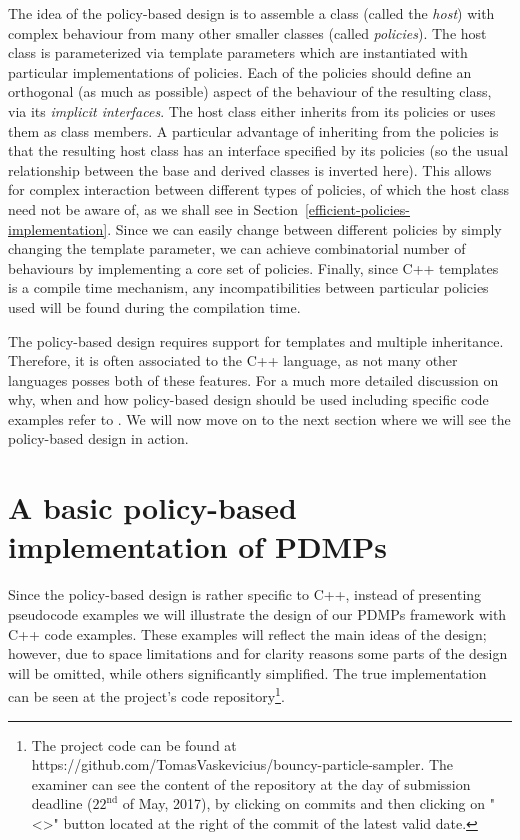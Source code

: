 \documentclass[report.tex]{subfiles}
\begin{document}
The idea of the policy-based design is to assemble a class (called the \textit{host})
with complex behaviour from many other smaller classes (called \textit{policies}).
The host class is parameterized via template parameters which are instantiated
with particular implementations of policies.
Each of the policies should define an orthogonal (as much as possible) aspect of the
behaviour of the resulting class, via its \textit{implicit interfaces}.
The host class either inherits from its policies or uses them as class members.
A particular advantage of inheriting from the policies is that the resulting
host class has an interface specified by its policies (so the usual relationship
between the base and derived classes is inverted here). This allows for complex
interaction between different types of policies, of which the host class need not
be aware of, as we shall see in
Section~\ref{efficient-policies-implementation}.
Since we can easily change between different policies by simply changing the template
parameter, we can achieve combinatorial number of behaviours by
implementing a core set of policies.
Finally, since C++ templates is a compile time mechanism, any incompatibilities
between particular policies used will be found during the compilation time.

The policy-based design requires support for templates and multiple inheritance.
Therefore, it is often associated to the C++ language, as not many other languages
posses both of these features.
For a much more detailed discussion on why, when and how
policy-based design should be used including specific code examples refer to \cite{alexandrescu2001modern}.
We will now move on to the next section where we will see the policy-based design in action.

\section{A basic policy-based implementation of PDMPs}

Since the policy-based design is rather specific to C++, instead of presenting pseudocode
examples we will illustrate the design  of our PDMPs framework with C++ code examples.
These examples will reflect the main ideas of the design; however, due to space
limitations and for clarity reasons some parts of the design will be omitted,
while others significantly simplified. The true implementation can be seen at
the project's code repository\footnote{
The project code can be found at https://github.com/TomasVaskevicius/bouncy-particle-sampler.
The examiner can see the content of the repository at the day of submission deadline
($22^{\text{nd}}$ of May, 2017), by clicking on commits and then clicking on "<>" button
located at the right of the commit of the latest valid date.
}.
\end{document}
